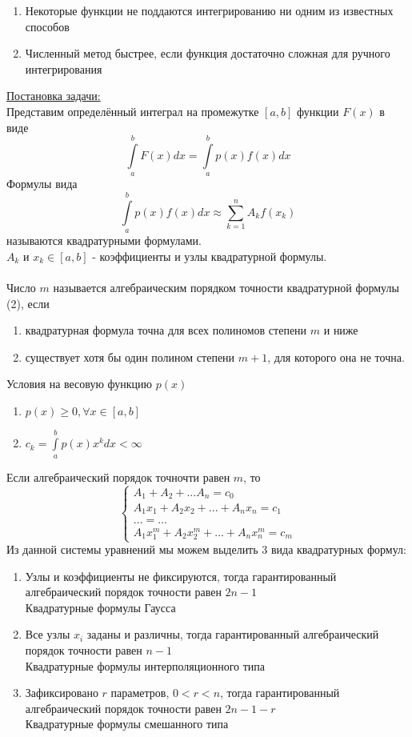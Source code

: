 \documentclass{article}
\begin{document}
	\begin{enumerate}
		\item Некоторые функции не поддаются интегрированию ни одним из известных способов
		\item Численный метод быстрее, если функция достаточно сложная для ручного интегрирования
	\end{enumerate}
	\underline{Постановка задачи:}\\
	Представим определённый интеграл на промежутке $[a,b]$ функции $F(x)$ в виде
	\begin{equation}
		\int\limits_{a}^{b}F(x)dx = \int\limits_{a}^{b}p(x)f(x)dx
	\end{equation}
	Формулы вида
	\begin{equation}
		\int\limits_{a}^{b}p(x)f(x)dx \approx \sum_{k=1}^{n}A_kf(x_k)
	\end{equation}
	называются квадратурными формулами.\\
	$A_k$ и $x_k \in [a,b]$ - коэффициенты и узлы квадратурной формулы.\\
	\\
	Число $m$ называется алгебраическим порядком точности квадратурной формулы (2), если 
	\begin{enumerate}
		\item квадратурная формула точна для всех полиномов степени $m$ и ниже
		\item существует хотя бы один полином степени $m+1$, для которого она не точна.
	\end{enumerate}
	Условия на весовую функцию $p(x)$
	\begin{enumerate}
		\item $p(x) \geq 0, \forall x \in [a,b]$
		\item $c_k = \int\limits_{a}^{b}p(x)x^kdx < \infty$
	\end{enumerate}
	Если алгебраический порядок точночти равен $m$, то
	\begin{equation}
		\begin{cases}
			A_1+A_2+...A_n = c_0\\
			A_1x_1+A_2x_2+...+A_nx_n = c_1\\
			... = ...\\
			A_1x_1^m+A_2x_2^m+...+A_nx_n^m = c_m
		\end{cases}
	\end{equation}
	Из данной системы уравнений мы можем выделить 3 вида квадратурных формул:
	\begin{enumerate}
		\item Узлы и коэффициенты не фиксируются, тогда гарантированный алгебраический порядок точности равен $2n-1$\\
		Квадратурные формулы Гаусса
		\item Все узлы $x_i$ заданы и различны, тогда гарантированный алгебраический порядок точности равен $n-1$\\ 
		Квадратурные формулы интерполяционного типа
		\item Зафиксировано $r$ параметров, $0<r<n$, тогда гарантированный алгебраический порядок точности равен $2n-1-r$\\
		Квадратурные формулы смешанного типа
	\end{enumerate}
\end{document}

